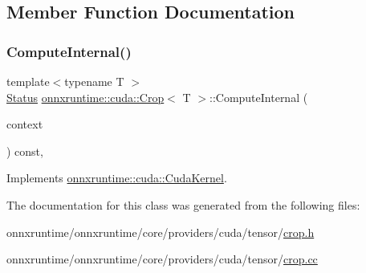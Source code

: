 \subsection{Member Function Documentation}
\mbox{\label{classonnxruntime_1_1cuda_1_1Crop_a7a73bc65e6c7d7b71cfe0443f5576145}} 
\subsubsection{\texorpdfstring{Compute\+Internal()}{ComputeInternal()}}
{\footnotesize\ttfamily template$<$typename T $>$ \\
\mbox{\hyperlink{classonnxruntime_1_1common_1_1Status}{Status}} \mbox{\hyperlink{classonnxruntime_1_1cuda_1_1Crop}{onnxruntime\+::cuda\+::\+Crop}}$<$ T $>$\+::Compute\+Internal (\begin{DoxyParamCaption}\item[{\mbox{\hyperlink{classonnxruntime_1_1OpKernelContext}{Op\+Kernel\+Context}} $\ast$}]{context }\end{DoxyParamCaption}) const\hspace{0.3cm}{\ttfamily [override]}, {\ttfamily [virtual]}}



Implements \mbox{\hyperlink{classonnxruntime_1_1cuda_1_1CudaKernel_aca7af04ae448017d6023d30bba231ebb}{onnxruntime\+::cuda\+::\+Cuda\+Kernel}}.



The documentation for this class was generated from the following files\+:\begin{DoxyCompactItemize}
\item 
onnxruntime/onnxruntime/core/providers/cuda/tensor/\mbox{\hyperlink{cuda_2tensor_2crop_8h}{crop.\+h}}\item 
onnxruntime/onnxruntime/core/providers/cuda/tensor/\mbox{\hyperlink{cuda_2tensor_2crop_8cc}{crop.\+cc}}\end{DoxyCompactItemize}
